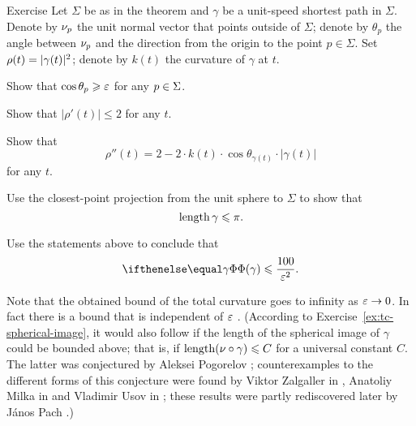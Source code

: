 \begin{thm}{Exercise}\label{ex:bound-tc}
Let $\Sigma$ be as in the theorem and $\gamma$ be a unit-speed shortest path in $\Sigma$.
Denote by $\nu_p$ the unit normal vector that points outside of $\Sigma$;
denote by $\theta_p$ the angle between $\nu_p$ and the direction from the origin to the point $p\in\Sigma$.
Set $\rho(t)\z=|\gamma(t)|^2$; denote by $k(t)$ the curvature of $\gamma$ at $t$.

\begin{subthm}{}
Show that $\cos\theta_p\geqslant \varepsilon$ for any $p\z\in \Sigma$.
\end{subthm}

\begin{subthm}{}
 Show that $|\rho'(t)|\le 2$ for any $t$.
\end{subthm}

\begin{subthm}{}
 Show that 
\[\rho''(t)=2-2\cdot k(t)\cdot \cos \theta_{\gamma(t)}\cdot |\gamma(t)|\]
for any $t$.
\end{subthm}

\begin{subthm}{}
 Use the closest-point projection from the unit sphere to $\Sigma$ to show that 
\[\mathop{\rm length}\nolimits \gamma\leqslant \pi.\]
\end{subthm}

\begin{subthm}{}
 Use the statements above to conclude that 
\[\tc\gamma\le \frac{100}{\eps^2}.\]
\end{subthm}

\end{thm}

Note that the obtained bound of the total curvature goes to infinity as $\varepsilon\to 0$.
In fact there is a bound that is independent of $\varepsilon$ \cite{lebedeva-petrunin}.
(According to Exercise~\ref{ex:tc-spherical-image}, it would also follow if the length of the spherical image of $\gamma$ could be bounded above; 
that is, if $\mathop{\rm length}\nolimits(\nu\circ\gamma)\leqslant C$ for a universal constant $C$.
The latter was conjectured by Aleksei Pogorelov \cite{pogorelov};
counterexamples to the different forms of this conjecture were found 
by Viktor Zalgaller in \cite{zalgaller},
Anatoliy Milka in \cite{milka}
and Vladimir Usov in \cite{usov};
these results were partly rediscovered later 
by J\'{a}nos Pach \cite{pach}.)
